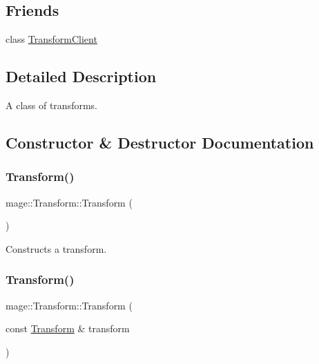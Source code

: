 \subsection*{Friends}
\begin{DoxyCompactItemize}
\item 
class \mbox{\hyperlink{classmage_1_1_transform_af7bc9408e1e31d66cb7fd971ff437a3a}{Transform\+Client}}
\end{DoxyCompactItemize}


\subsection{Detailed Description}
A class of transforms. 

\subsection{Constructor \& Destructor Documentation}
\mbox{\label{classmage_1_1_transform_a0fe54a3ac740025755d567a423c39de0}} 
\subsubsection{\texorpdfstring{Transform()}{Transform()}\hspace{0.1cm}{\footnotesize\ttfamily [1/3]}}
{\footnotesize\ttfamily mage\+::\+Transform\+::\+Transform (\begin{DoxyParamCaption}{ }\end{DoxyParamCaption})\hspace{0.3cm}{\ttfamily [noexcept]}}

Constructs a transform. \mbox{\label{classmage_1_1_transform_aa26f3bb808d660ff5fccf594c0958386}} 
\subsubsection{\texorpdfstring{Transform()}{Transform()}\hspace{0.1cm}{\footnotesize\ttfamily [2/3]}}
{\footnotesize\ttfamily mage\+::\+Transform\+::\+Transform (\begin{DoxyParamCaption}\item[{const \mbox{\hyperlink{classmage_1_1_transform}{Transform}} \&}]{transform }\end{DoxyParamCaption})\hspace{0.3cm}{\ttfamily [noexcept]}}

